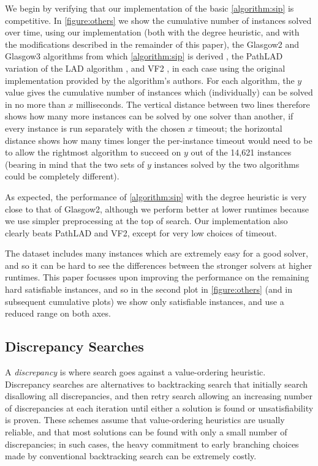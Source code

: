 \documentclass{article}
\newcommand{\citep}[1]{\cite{#1}}
\begin{document}
We begin by verifying that our implementation of the basic \cref{algorithm:sip} is competitive. In
\cref{figure:others} we show the cumulative number of instances solved over time, using our
implementation (both with the degree heuristic, and with the modifications described in the
remainder of this paper), the Glasgow2 and Glasgow3 algorithms from which \cref{algorithm:sip} is derived
\citep{DBLP:conf/cp/McCreeshP15,DBLP:conf/lion/KotthoffMS16}, the PathLAD variation of the LAD
algorithm \citep{DBLP:journals/ai/Solnon10,DBLP:conf/lion/KotthoffMS16}, and VF2
\citep{DBLP:journals/pami/CordellaFSV04}, in each case using the original implementation provided
by the algorithm's authors. For each algorithm, the $y$ value
gives the cumulative number of instances which (individually) can be solved in no more than $x$
milliseconds.  The vertical distance between two lines therefore shows how many more instances can
be solved by one solver than another, if every instance is run separately with the chosen $x$
timeout; the horizontal distance shows how many times longer the per-instance timeout would need to
be to allow the rightmost algorithm to succeed on $y$ out of the 14,621 instances (bearing in mind
that the two sets of $y$ instances solved by the two algorithms could be completely different).

As expected, the performance of \cref{algorithm:sip} with the degree heuristic is very close to that
of Glasgow2, although we perform better at lower runtimes because we use simpler preprocessing at
the top of search. Our implementation also clearly beats PathLAD and VF2, except for very low
choices of timeout.

The dataset includes many instances which are extremely easy for a good solver, and so it can be
hard to see the differences between the stronger solvers at higher runtimes. This paper focusses
upon improving the performance on the remaining hard satisfiable instances, and so in the second
plot in \cref{figure:others} (and in subsequent cumulative plots) we show only satisfiable
instances, and use a reduced range on both axes.

\subsection{Discrepancy Searches}

A \emph{discrepancy} is where search goes against a value-ordering heuristic.  Discrepancy searches
\citep{DBLP:conf/ijcai/HarveyG95,DBLP:conf/aaai/Korf96,DBLP:conf/ijcai/Walsh97} are alternatives to
backtracking search that initially search disallowing all discrepancies, and then retry search
allowing an increasing number of discrepancies at each iteration until either a solution is found or
unsatisfiability is proven. These schemes assume that value-ordering heuristics are usually
reliable, and that most solutions can be found with only a small number of discrepancies; in such
cases, the heavy commitment to early branching choices made by conventional backtracking search can
be extremely costly.
\end{document}
